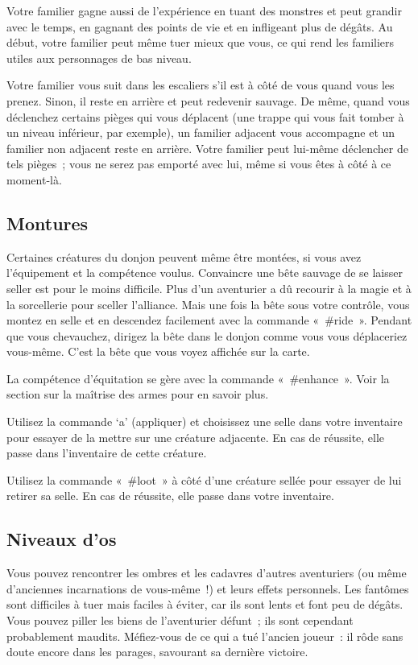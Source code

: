 \documentclass[titlepage]{article}
\begin{document}
Votre familier gagne aussi de l'expérience en tuant des monstres et peut
grandir avec le temps, en gagnant des points de vie et en infligeant plus
de dégâts.
Au début, votre familier peut même tuer mieux que vous, ce qui rend les
familiers utiles aux personnages de bas niveau.


Votre familier vous suit dans les escaliers s'il est à côté de vous quand
vous les prenez.
Sinon, il reste en arrière et peut redevenir sauvage.
De même, quand vous déclenchez certains pièges qui vous déplacent (une
trappe qui vous fait tomber à un niveau inférieur, par exemple), un
familier adjacent vous accompagne et un familier non adjacent reste en
arrière.
Votre familier peut lui-même déclencher de tels pièges~; vous ne serez pas
emporté avec lui, même si vous êtes à côté à ce moment-là.

\subsection{Montures}



Certaines créatures du donjon peuvent même être montées, si vous avez
l'équipement et la compétence voulus.
Convaincre une bête sauvage de se laisser seller est pour le moins
difficile.
Plus d'un aventurier a dû recourir à la magie et à la sorcellerie pour
sceller l'alliance.
Mais une fois la bête sous votre contrôle, vous montez en selle et en
descendez facilement avec la commande «~\#ride~».
Pendant que vous chevauchez, dirigez la bête dans le donjon comme vous vous
déplaceriez vous-même.
C'est la bête que vous voyez affichée sur la carte.


La compétence d'équitation se gère avec la commande «~\#enhance~».
Voir la section sur la maîtrise des armes pour en savoir plus.


Utilisez la commande `a' (appliquer) et choisissez une selle dans
votre inventaire pour essayer de la mettre sur une créature adjacente.
En cas de réussite, elle passe dans l'inventaire de cette créature.


Utilisez la commande «~\#loot~» à côté d'une créature sellée pour
essayer de lui retirer sa selle.
En cas de réussite, elle passe dans votre inventaire.

\subsection{Niveaux d'os}



Vous pouvez rencontrer les ombres et les cadavres d'autres aventuriers (ou
même d'anciennes incarnations de vous-même~!) et leurs effets personnels.
Les fantômes sont difficiles à tuer mais faciles à éviter, car ils sont
lents et font peu de dégâts.
Vous pouvez piller les biens de l'aventurier défunt~; ils sont cependant
probablement maudits.
Méfiez-vous de ce qui a tué l'ancien joueur~: il rôde sans doute encore
dans les parages, savourant sa dernière victoire.
\end{document}
